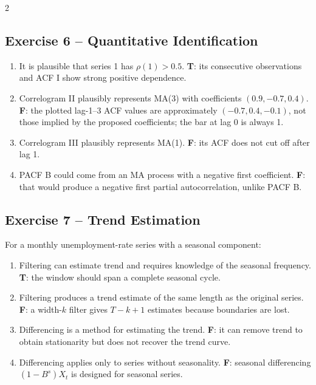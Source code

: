 \documentclass[9pt,a4paper]{extarticle}
\begin{document}
\begin{multicols}{2}
\subsection*{Exercise 6 -- Quantitative Identification}
\begin{enumerate}[label=\alph*),leftmargin=4mm]
\item It is plausible that series 1 has \(\rho(1)>0.5\). \textbf{T}: its consecutive observations and ACF I show strong positive dependence.
\item Correlogram II plausibly represents MA(3) with coefficients \((0.9,-0.7,0.4)\). \textbf{F}: the plotted lag-1--3 ACF values are approximately \((-0.7,0.4,-0.1)\), not those implied by the proposed coefficients; the bar at lag 0 is always 1.
\item Correlogram III plausibly represents MA(1). \textbf{F}: its ACF does not cut off after lag 1.
\item PACF B could come from an MA process with a negative first coefficient. \textbf{F}: that would produce a negative first partial autocorrelation, unlike PACF B.
\end{enumerate}

\subsection*{Exercise 7 -- Trend Estimation}
For a monthly unemployment-rate series with a seasonal component:
\begin{enumerate}[label=\alph*),leftmargin=4mm]
\item Filtering can estimate trend and requires knowledge of the seasonal frequency. \textbf{T}: the window should span a complete seasonal cycle.
\item Filtering produces a trend estimate of the same length as the original series. \textbf{F}: a width-\(k\) filter gives \(T-k+1\) estimates because boundaries are lost.
\item Differencing is a method for estimating the trend. \textbf{F}: it can remove trend to obtain stationarity but does not recover the trend curve.
\item Differencing applies only to series without seasonality. \textbf{F}: seasonal differencing \((1-B^s)X_t\) is designed for seasonal series.
\end{enumerate}


\end{multicols}
\end{document}
